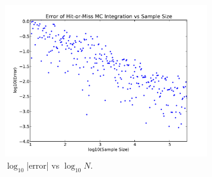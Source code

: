 \documentclass[11pt,letterpaper]{article}
\begin{document}
\begin{figure}
\centering
\includegraphics[width=0.8\textwidth]{MCint_logerr_plot.pdf}
\caption{$\log_{10}$|error| vs $\log_{10} N$.}
\label{fig:intplot2}
\end{figure} 
\end{document}
